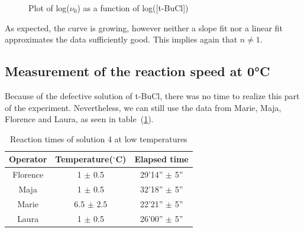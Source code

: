 \documentclass[12pt]{article}
\begin{document}
\begin{figure}[!ht]
    \centering
    \caption{Plot of log($\nu_0$) as a function of log([t-BuCl])}
    \label{fig:logPlot}
\end{figure}
\FloatBarrier

\noindent As expected, the curve is growing, however neither a slope fit nor a linear fit approximates the data sufficiently good. This implies again that $n \neq 1$.

\subsection{Measurement of the reaction speed at 0°C}
Because of the defective solution of t-BuCl, there was no time to realize this part of the experiment. Nevertheless, we can still use the data from Marie, Maja, Florence and Laura, as seen in table~(\ref{tab:dt0C}).

\begin{table}[!ht]
    \centering
    \begin{tabular}{c|c|c}
        Operator & Temperature($^{\circ}$C) & Elapsed time \\ \hline
        Florence & 1 $\pm$ 0.5   & 29'14'' $\pm$ 5'' \\
        Maja     & 1 $\pm$ 0.5   & 32'18'' $\pm$ 5'' \\
        Marie    & 6.5 $\pm$ 2.5 & 22'21'' $\pm$ 5'' \\
        Laura    & 1 $\pm$ 0.5   & 26'00'' $\pm$ 5''
    \end{tabular}
    \caption{Reaction times of solution 4 at low temperatures}
    \label{tab:dt0C}
\end{table}
\end{document}
